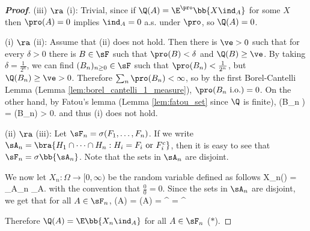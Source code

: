 \begin{proof}[\bf Proof]
(iii) $\ra$ (i): Trivial, since if $\Q(A) = \E^\pro\bb{X\ind_A}$ for some $X$ then $\pro(A) = 0$ implies $\ind_A = 0$ a.s. under $\pro$, so $\Q(A) = 0$.

(i) $\ra$ (ii): Assume that (ii) does not hold. Then there is $\ve > 0$ such that for every $\delta > 0$ there is $B \in \sF$ such that $\pro(B) < \delta$ and $\Q(B) \geq \ve$. By taking $\delta = \frac 1{2^n}$, we can find $(B_n)_{n \geq 0}\in \sF$ such that $\pro(B_n) < \frac 1{2^n}$, but $\Q(B_n) \geq \ve > 0$. Therefore $\sum_n \pro(B_n) < \infty$, so by the first Borel-Cantelli Lemma (Lemma \ref{lem:borel_cantelli_1_measure}), $\pro(B_n \text{ i.o.}) = 0$. On the other hand, by Fatou's lemma (Lemma \ref{lem:fatou_set} since $\Q$ is finite),
\be
\Q(B_n ) = \Q{} \geq \limsup \Q(B_n) \geq \ve > 0.%
\ee
and thus (i) does not hold.


(ii) $\ra$ (iii): Let $\sF_n = \sigma(F_1, \dots, F_n)$. If we write $\sA_n = \bra{H_1\cap \dots \cap H_n:H_i = F_i \text{ or }F_i^c}$, then it is easy to see that $\sF_n = \sigma\bb{\sA_n}$. Note that the sets in $\sA_n$ are disjoint.


We now let $X_n:\Omega \to [0,\infty)$ be the random variable defined as follows
\be
X_n(\omega) = \sum_{A\in \sA_n} \ind_A.
\ee
with the convention that $\frac 00 = 0$. Since the sets in $\sA_n$ are disjoint, we get that for all $A\in \sF_n$,
\be
\Q(A) =  \pro(A) = \E^\pro{} = \E^\pro{}
\ee


Therefore $\Q(A) = \E\bb{X_n\ind_A}$ for all $A\in \sF_n$ ($*$).%


\end{proof}
